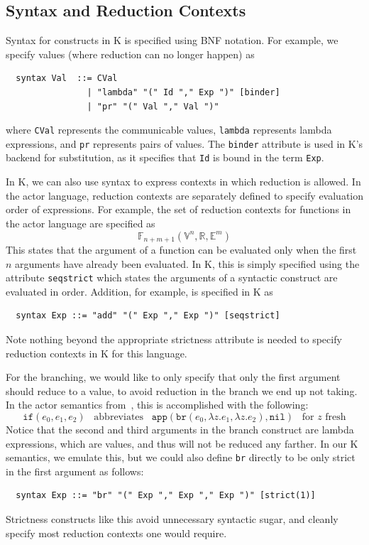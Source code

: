 \documentclass{llncs}
\begin{document}
\subsection{Syntax and Reduction Contexts}
Syntax for constructs in K is specified using BNF notation. For example, we
specify values (where reduction can no longer happen) as
\begin{verbatim}
  syntax Val  ::= CVal                                    
                | "lambda" "(" Id "," Exp ")" [binder]
                | "pr" "(" Val "," Val ")"
\end{verbatim}
where \texttt{CVal} represents the communicable values, \texttt{lambda}
represents lambda expressions, and \texttt{pr} represents pairs of values.  The
\texttt{binder} attribute is used in K's backend for substitution, as it
specifies that \texttt{Id} is bound in the term \texttt{Exp}.

In K, we can also use syntax to express contexts in which reduction is allowed.
In the actor language, reduction contexts are separately defined to specify
evaluation order of expressions. For example, the set of reduction contexts for
functions in the actor language are specified as
\[ \mathbb{F}_{n+m+1}(\mathbb{V}^n,\mathbb{R},\mathbb{E}^m) \]
This states that the argument of a function can be evaluated only when the first
$n$ arguments have already been evaluated. In K, this is simply specified using
the attribute \texttt{seqstrict} which states the arguments of a syntactic
construct are evaluated in order. Addition, for example, is specified in K as
\begin{verbatim}
  syntax Exp ::= "add" "(" Exp "," Exp ")" [seqstrict]
\end{verbatim}
Note nothing beyond the appropriate strictness attribute is needed to specify
reduction contexts in K for this language.

For the branching, we would like to only specify that only the first argument
should reduce to a value, to avoid reduction in the branch we end up not taking.
In the actor semantics from~\cite{actor}, this is accomplished with the following:
\[ \texttt{if}(e_0, e_1, e_2) \;\;\;\text{abbreviates}\;\;\; \texttt{app}(\texttt{br}(e_0, \lambda z.e_1, \lambda z.e_2), \texttt{nil}) \;\;\;\text{for $z$ fresh} \]
Notice that the second and third arguments in the branch construct are lambda
expressions, which are values, and thus will not be reduced any farther. In our
K semantics, we emulate this, but we could also define \texttt{br} directly to
be only strict in the first argument as follows:
\begin{verbatim}
  syntax Exp ::= "br" "(" Exp "," Exp "," Exp ")" [strict(1)]
\end{verbatim}
Strictness constructs like this avoid unnecessary syntactic sugar, and cleanly
specify most reduction contexts one would require.
\end{document}
